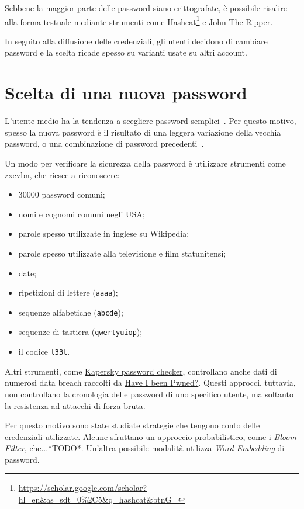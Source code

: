 Sebbene la maggior parte delle password siano crittografate, è possibile risalire alla forma testuale mediante strumenti come Hashcat\footnote{\url{https://scholar.google.com/scholar?hl=en&as_sdt=0\%2C5&q=hashcat&btnG=}} e John The Ripper.

In seguito alla diffusione delle credenziali, gli utenti decidono di cambiare password e la scelta ricade spesso su varianti usate su altri account.
\section{Scelta di una nuova password}

L'utente medio ha la tendenza a scegliere password semplici~\cite{obspasshab}. Per questo motivo, spesso la nuova password è il risultato di una leggera variazione della vecchia password, o una combinazione di password precedenti~\cite{hypr}.

Un modo per verificare la sicurezza della password è utilizzare strumenti come \href{https://github.com/dropbox/zxcvbn}{zxcvbn}, che riesce a riconoscere:
\begin{itemize}
    \item 30000 password comuni;
    \item nomi e cognomi comuni negli USA;
    \item parole spesso utilizzate in inglese su Wikipedia;
    \item parole spesso utilizzate alla televisione e film statunitensi;
    \item date;
    \item ripetizioni di lettere (\texttt{aaaa});
    \item sequenze alfabetiche (\texttt{abcde});
    \item sequenze di tastiera (\texttt{qwertyuiop});
    \item il codice \texttt{l33t}.    
\end{itemize}

Altri strumenti, come \href{https://password.kaspersky.com/it/}{Kapersky password checker}, controllano anche dati di numerosi data breach raccolti da \href{https://haveibeenpwned.com/}{Have I been Pwned?}.
Questi approcci, tuttavia, non controllano la cronologia delle password di uno specifico utente, ma soltanto la resistenza ad attacchi di forza bruta.

Per questo motivo sono state studiate strategie che tengono conto delle credenziali utilizzate.
Alcune sfruttano un approccio probabilistico, come i \emph{Bloom Filter}, che...*TODO*. Un'altra possibile modalità utilizza \emph{Word Embedding} di password.

